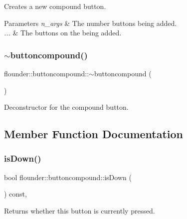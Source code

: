 Creates a new compound button. 


\begin{DoxyParams}{Parameters}
{\em n\+\_\+args} & The number buttons being added. \\
\hline
{\em ...} & The buttons on the being added. \\
\hline
\end{DoxyParams}
\mbox{\label{classflounder_1_1buttoncompound_a6abb7a06910785964c92942e7ed00ef8}} 
\subsubsection{\texorpdfstring{$\sim$buttoncompound()}{~buttoncompound()}}
{\footnotesize\ttfamily flounder\+::buttoncompound\+::$\sim$buttoncompound (\begin{DoxyParamCaption}{ }\end{DoxyParamCaption})}



Deconstructor for the compound button. 



\subsection{Member Function Documentation}
\mbox{\label{classflounder_1_1buttoncompound_a60ac6caaca37cd841c725259906a9196}} 
\subsubsection{\texorpdfstring{is\+Down()}{isDown()}}
{\footnotesize\ttfamily bool flounder\+::buttoncompound\+::is\+Down (\begin{DoxyParamCaption}{ }\end{DoxyParamCaption}) const\hspace{0.3cm}{\ttfamily [override]}, {\ttfamily [virtual]}}



Returns whether this button is currently pressed. 

